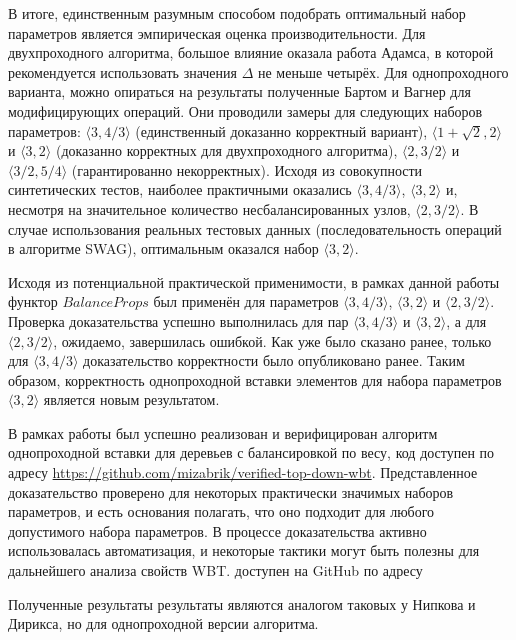 \documentclass[a4paper,14pt]{extarticle}
\begin{document}
В итоге, единственным разумным способом
подобрать оптимальный набор параметров
является эмпирическая оценка производительности.
Для двухпроходного алгоритма,
большое влияние оказала работа Адамса\cite{adams},
в которой рекомендуется использовать
значения \( \Delta \) не меньше четырёх.
Для однопроходного варианта,
можно опираться на результаты полученные
Бартом и Вагнер для модифицирующих операций\cite{barth}.
Они проводили замеры для следующих наборов параметров:
\( \langle 3, 4/3 \rangle \)
(единственный доказанно корректный вариант),
\( \langle 1 + \sqrt{2}, 2 \rangle \) и
\( \langle 3, 2 \rangle \)
(доказанно корректных для двухпроходного алгоритма),
\( \langle 2, 3/2 \rangle \) и
\( \langle 3/2, 5/4 \rangle \)
(гарантированно некорректных).
Исходя из совокупности синтетических тестов,
наиболее практичными
оказались \( \langle 3, 4/3 \rangle \),
\( \langle 3, 2 \rangle \)
и, несмотря на значительное количество несбалансированных узлов,
\( \langle 2, 3/2 \rangle \).
В случае использования реальных тестовых данных
(последовательность операций в алгоритме SWAG\cite{swag}),
оптимальным оказался набор \( \langle 3, 2 \rangle \).

Исходя из потенциальной практической применимости,
в рамках данной работы 
функтор \( BalanceProps \) был применён
для параметров
\( \langle 3, 4/3 \rangle \), \( \langle 3, 2 \rangle \)
и \( \langle 2, 3/2 \rangle \).
Проверка доказательства успешно выполнилась
для пар \( \langle 3, 4/3 \rangle \)
и \( \langle 3, 2 \rangle \),
а для \( \langle 2, 3/2 \rangle \),
ожидаемо, завершилась ошибкой.
Как уже было сказано ранее,
только для \( \langle 3, 4/3 \rangle \) 
доказательство корректности было опубликовано ранее.
Таким образом, корректность
однопроходной вставки элементов
для набора параметров \( \langle 3, 2 \rangle \)
является новым результатом.

\clearpage
{}

В рамках работы был успешно реализован и верифицирован алгоритм однопроходной
вставки для деревьев с балансировкой по весу,
код доступен по адресу \url{https://github.com/mizabrik/verified-top-down-wbt}.
Представленное доказательство проверено для некоторых практически значимых наборов параметров,
и есть основания полагать, что оно подходит для любого допустимого набора параметров.
В процессе доказательства активно использовалась автоматизация,
и некоторые тактики могут быть полезны для дальнейшего анализа свойств WBT.
 доступен на GitHub
по адресу 

Полученные результаты результаты
являются аналогом таковых у Нипкова и Дирикса\cite{nipkow},
но для однопроходной версии алгоритма.
\end{document}

